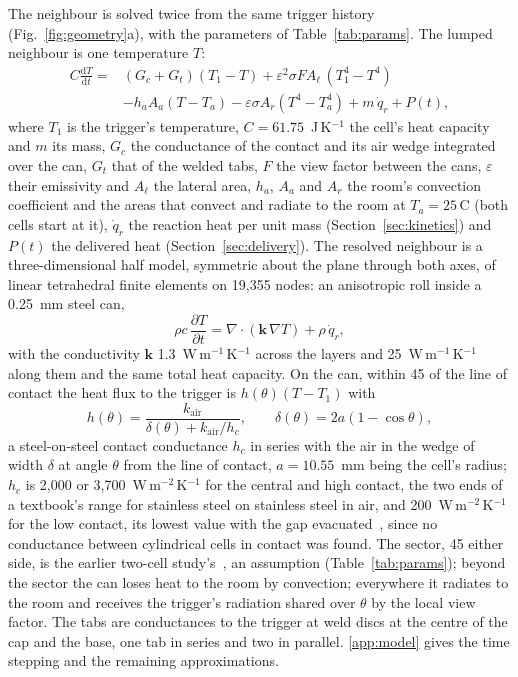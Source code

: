 \documentclass[preprint,12pt]{elsarticle}
\newcommand{\degC}{\,\textdegree C}
\begin{document}
The neighbour is solved twice from the same trigger history (Fig.~\ref{fig:geometry}a), with the parameters of Table~\ref{tab:params}. The lumped neighbour is one temperature $T$:
\begin{equation}
\begin{split}
C\frac{\mathrm{d}T}{\mathrm{d}t}={}&(G_c+G_t)(T_1-T)+\varepsilon^2\sigma F A_\ell\,(T_1^4-T^4)\\
&-h_a A_a(T-T_a)-\varepsilon\sigma A_r(T^4-T_a^4)+m\,\dot q_r+P(t),
\end{split}
\label{eq:lumped}
\end{equation}
where $T_1$ is the trigger's temperature, $C=61.75$~J\,K$^{-1}$ the cell's heat capacity and $m$ its mass, $G_c$ the conductance of the contact and its air wedge integrated over the can, $G_t$ that of the welded tabs, $F$ the view factor between the cans, $\varepsilon$ their emissivity and $A_\ell$ the lateral area, $h_a$, $A_a$ and $A_r$ the room's convection coefficient and the areas that convect and radiate to the room at $T_a=25$\degC{} (both cells start at it), $\dot q_r$ the reaction heat per unit mass (Section~\ref{sec:kinetics}) and $P(t)$ the delivered heat (Section~\ref{sec:delivery}). The resolved neighbour is a three-dimensional half model, symmetric about the plane through both axes, of linear tetrahedral finite elements on 19,355 nodes: an anisotropic roll inside a 0.25~mm steel can,
\begin{equation}
\rho c\,\frac{\partial T}{\partial t}=\nabla\cdot(\mathbf{k}\,\nabla T)+\rho\,\dot q_r ,
\label{eq:resolved}
\end{equation}
with the conductivity $\mathbf{k}$ 1.3~W\,m$^{-1}$\,K$^{-1}$ across the layers and 25~W\,m$^{-1}$\,K$^{-1}$ along them and the same total heat capacity. On the can, within 45\textdegree{} of the line of contact the heat flux to the trigger is $h(\theta)(T-T_1)$ with
\begin{equation}
h(\theta)=\frac{k_\mathrm{air}}{\delta(\theta)+k_\mathrm{air}/h_c},\qquad \delta(\theta)=2a(1-\cos\theta),
\label{eq:contact}
\end{equation}
a steel-on-steel contact conductance $h_c$ in series with the air in the wedge of width $\delta$ at angle $\theta$ from the line of contact, $a=10.55$~mm being the cell's radius; $h_c$ is 2,000 or 3,700~W\,m$^{-2}$\,K$^{-1}$ for the central and high contact, the two ends of a textbook's range for stainless steel on stainless steel in air, and 200~W\,m$^{-2}$\,K$^{-1}$ for the low contact, its lowest value with the gap evacuated~\cite[Table~2.1]{lienhard2024heat}, since no conductance between cylindrical cells in contact was found. The sector, 45\textdegree{} either side, is the earlier two-cell study's~\cite{satte2026twocell}, an assumption (Table~\ref{tab:params}); beyond the sector the can loses heat to the room by convection; everywhere it radiates to the room and receives the trigger's radiation shared over $\theta$ by the local view factor. The tabs are conductances to the trigger at weld discs at the centre of the cap and the base, one tab in series and two in parallel. \ref{app:model} gives the time stepping and the remaining approximations.
\end{document}
